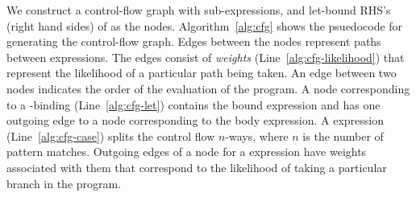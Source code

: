 %
We construct a control-flow graph with sub-expressions, and let-bound RHS's (right hand sides) of \systemlang{} as the nodes.
Algorithm~\ref{alg:cfg} shows the psuedocode for generating the control-flow graph.
%
%
Edges between the nodes represent paths between expressions. The edges consist of {\em weights} (Line~\ref{alg:cfg-likelihood})
that represent the likelihood of a particular path being taken.
%
An edge between two nodes indicates the order of the evaluation of the program.
%
A node corresponding to a -binding (Line~\ref{alg:cfg-let}) contains the bound expression
and has one outgoing edge to a node corresponding to the body expression.
%
A  expression (Line~\ref{alg:cfg-case}) splits the control flow $n$-ways,
where $n$ is the number of pattern matches.
{Outgoing edges of a node for a  expression have weights
  associated with them that correspond to the likelihood of taking a
  particular branch in the program.}
